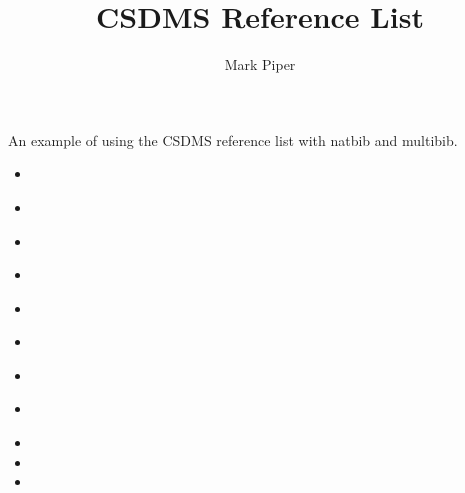 \documentclass[11pt]{article}
\begin{document}
\title{CSDMS Reference List}
\author{Mark Piper}
\maketitle

An example of using the CSDMS reference list
with natbib and multibib.

\begin{itemize}
\item \citep{tucker2010modeling}
\item \citet{overeem2015strategies}
\item \citep{kettner2008hydrotrend}
\item \citet{hutton2008sedflux}
\item \cite{piper2015wmt}
\item \cite{blanca2017compute}
\item \cite{jupyter2015notebook}
\item \cite{gdal2017gdal}
\item {}
\item {}
\item {}
\end{itemize}




\end{document}
